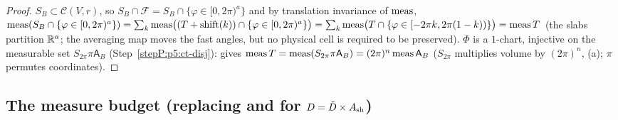 \begin{proof}
\label{stepP:p5:ct-count} $S_B\subset\mathcal C(V,r)$, so $S_B\cap\mathcal F=S_B\cap\{\varphi\in[0,2\pi)^a\}$ and by translation invariance of $\operatorname{meas}$, $\operatorname{meas}(S_B\cap\{\varphi\in[0,2\pi)^a\})=\sum_k\operatorname{meas}\bigl((T+\operatorname{shift}(k))\cap\{\varphi\in[0,2\pi)^a\}\bigr)=\sum_k\operatorname{meas}\bigl(T\cap\{\varphi\in[-2\pi k,2\pi(1-k))\}\bigr)=\operatorname{meas} T$ (the slabs partition $\mathbb{R}^a$; the averaging map moves the fast angles, but no physical cell is required to be preserved).
\label{stepP:p5:ct-liou} $\Phi$ is a $1$-chart, injective on the measurable set $S_{2\pi}\pi\mathsf A_B$ (Step~\ref{stepP:p5:ct-disj}):  gives $\operatorname{meas} T=\operatorname{meas}(S_{2\pi}\pi\mathsf A_B)=(2\pi)^n\operatorname{meas}\mathsf A_B$ ($S_{2\pi}$ multiplies volume by $(2\pi)^n$, (a); $\pi$ permutes coordinates).
\end{proof}


\subsection{The measure budget (replacing  and  for $D=\check D\times A_{\rm sh}$)}\label{bpP:p5:measure}

